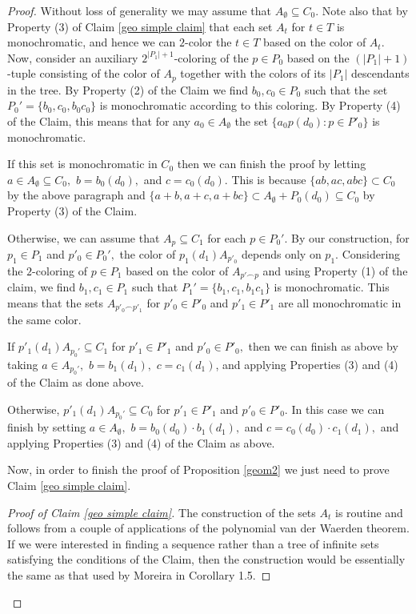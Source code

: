 \documentclass[tocmacros]{daj}
\begin{document}
\begin{proof}
Without loss of generality we may assume that $A_\emptyset\subseteq C_0.$  Note also that by Property (3) of Claim \ref{geo simple claim} that each set $A_t$ for $t\in T$ is monochromatic, and hence we can $2$-color the $t\in T$ based on the color of $A_t$.  Now, consider an auxiliary $2^{|P_1|+1}$-coloring of the $p\in P_0$ based on the $(|P_1|+1)$-tuple consisting of the color of $A_p$ together with the colors of its $|P_1|$ descendants in the tree.  By Property (2) of the Claim we find $b_0,c_0\in P_0$ such that the set $P_0'=\{{b_0}, {c_0}, {b_0c_0}\}$ is monochromatic according to this coloring.  By Property (4) of the Claim, this means that for any $a_0\in A_\emptyset$ the set $\{a_0p(d_0): p\in P'_0\}$ is monochromatic.

If this set is monochromatic in $C_0$ then we can finish the proof by letting $a\in A_\emptyset\subseteq C_0,$ $b={b_0(d_0)},$ and $c={c_0(d_0)}.$ This is because $\{ab,ac,abc\}\subset C_0$ by the above paragraph and $\{a+b,a+c,a+bc\}\subset A_\emptyset+P_0(d_0)\subseteq C_0$ by Property (3) of the Claim.

Otherwise, we can assume that $A_{p}\subseteq C_1$ for each $p\in P_0'.$  By our construction, for $p_1\in P_1$ and $p'_0
\in P_0',$ the color of $p_1(d_1)A_{p'_0}$ depends only on $p_1.$  Considering the $2$-coloring of $p\in P_1$ based on the color of $A_{p'\smallfrown p}$ and using Property (1) of the claim, we find $b_1,c_1\in P_1$ such that $P_1'=\{{b_1}, {c_1}, {b_1c_1}\}$ is monochromatic.  This means that the sets $A_{p'_0\smallfrown p'_1}$ for $p'_0\in P'_0$ and $p'_1\in P'_1$ are all monochromatic in the same color.

If $p'_1(d_1)A_{p_0'}\subseteq C_1$ for $p'_1\in P'_1$ and $p'_0\in P'_0,$ then we can finish as above by taking $a\in A_{p_0'},$ $b={b_1(d_1)},$ $c={c_1(d_1)}$, and applying Properties (3) and (4) of the Claim as done above.

Otherwise, $p'_1(d_1)A_{p_0'}\subseteq C_0$ for $p'_1\in P'_1$ and $p'_0\in P'_0.$  In this case we can finish by setting $a\in A_\emptyset,$ $b={b_0}(d_0)\cdot {b_1(d_1)},$ and $c={c_0(d_0)}\cdot {c_1(d_1)},$ and applying Properties (3) and (4) of the Claim as above.



Now, in order to finish the proof of Proposition \ref{geom2} we just need to prove Claim \ref{geo simple claim}.

\begin{proof}[Proof of Claim \ref{geo simple claim}]
The construction of the sets $A_t$ is routine and follows from a couple of applications of the polynomial van der Waerden theorem.  If we were interested in finding a sequence rather than a tree of infinite sets satisfying the conditions of the Claim, then the construction would be essentially the same as that used by Moreira in \cite{moreira2017monochromatic} Corollary 1.5.


\end{proof}
\end{proof}
\end{document}
